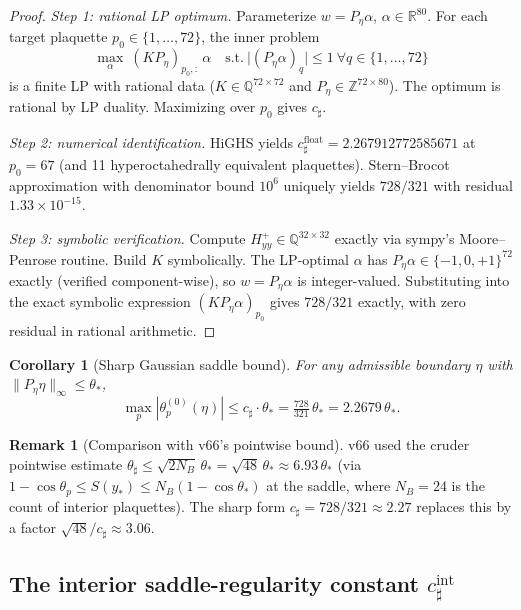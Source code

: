 \documentclass[11pt]{article}
\newtheorem{corollary}[theorem]{Corollary}
\theoremstyle{definition}
\newtheorem{remark}[theorem]{Remark}
\newcommand{\R}{\mathbb{R}}
\newcommand{\Z}{\mathbb{Z}}
\newcommand{\Q}{\mathbb{Q}}
\begin{document}
\begin{proof}
\emph{Step 1: rational LP optimum.}  Parameterize
$w=P_\eta\alpha$, $\alpha\in\R^{80}$.  For each target plaquette
$p_0\in\{1,\ldots,72\}$, the inner problem
\[
\max_\alpha\ (KP_\eta)_{p_0,:}\,\alpha\quad\text{s.t.}\
\bigl|(P_\eta\alpha)_q\bigr|\le 1\ \forall q\in\{1,\ldots,72\}
\]
is a finite LP with rational data ($K\in\Q^{72\times 72}$ and
$P_\eta\in\Z^{72\times 80}$).  The optimum is rational by LP
duality.  Maximizing over $p_0$ gives $c_\sharp$.

\emph{Step 2: numerical identification.}  HiGHS yields
$c_\sharp^{\mathrm{float}}=2.267912772585671$ at $p_0=67$ (and 11
hyperoctahedrally equivalent plaquettes).  Stern--Brocot
approximation with denominator bound $10^6$ uniquely yields
$728/321$ with residual $1.33\times 10^{-15}$.

\emph{Step 3: symbolic verification.}  Compute
$H_{yy}^+\in\Q^{32\times 32}$ exactly via sympy's Moore--Penrose
routine.  Build $K$ symbolically.  The LP-optimal $\alpha$ has
$P_\eta\alpha\in\{-1,0,+1\}^{72}$ exactly (verified component-wise),
so $w=P_\eta\alpha$ is integer-valued.  Substituting into the
exact symbolic expression $(KP_\eta\alpha)_{p_0}$ gives $728/321$
exactly, with zero residual in rational arithmetic.
\end{proof}

\begin{corollary}[Sharp Gaussian saddle bound]\label{cor:gauss-bound}
For any admissible boundary $\eta$ with $\|P_\eta\eta\|_\infty\le\theta_*$,
\[
\max_p|\theta_p^{(0)}(\eta)|\le c_\sharp\cdot\theta_*
=\tfrac{728}{321}\,\theta_*=2.2679\,\theta_*.
\]
\end{corollary}

\begin{remark}[Comparison with v66's pointwise bound]
v66 used the cruder pointwise estimate $\theta_\sharp\le\sqrt{2N_B}\,
\theta_*=\sqrt{48}\,\theta_*\approx 6.93\,\theta_*$ (via
$1-\cos\theta_p\le S(y_*)\le N_B(1-\cos\theta_*)$ at the saddle,
where $N_B=24$ is the count of interior plaquettes).
The sharp form $c_\sharp=728/321\approx 2.27$ replaces this by a
factor $\sqrt{48}/c_\sharp\approx 3.06$.
\end{remark}

\subsection{The interior saddle-regularity constant $c_\sharp^{\mathrm{int}}$}
\label{subsec:csharp-int}
\end{document}
